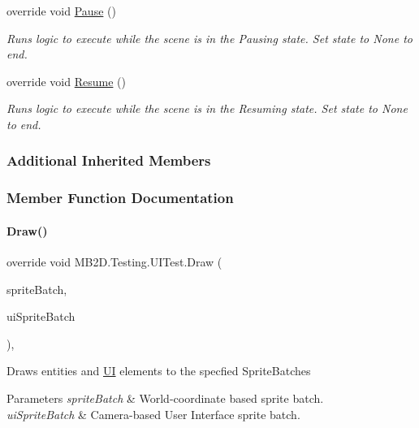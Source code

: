 \begin{DoxyCompactItemize}
override void \hyperlink{class_m_b2_d_1_1_testing_1_1_u_i_test_ae829ddfd489047674efb3131d360901a}{Pause} ()
\begin{DoxyCompactList}\small\item\em Runs logic to execute while the scene is in the Pausing state. Set state to None to end. \end{DoxyCompactList}\item 
override void \hyperlink{class_m_b2_d_1_1_testing_1_1_u_i_test_a933c2bf347db47bf2921709c10d78acc}{Resume} ()
\begin{DoxyCompactList}\small\item\em Runs logic to execute while the scene is in the Resuming state. Set state to None to end. \end{DoxyCompactList}\end{DoxyCompactItemize}
\subsubsection*{Additional Inherited Members}


\subsubsection{Member Function Documentation}
\hypertarget{class_m_b2_d_1_1_testing_1_1_u_i_test_a9656d2d62517288a7b4387dafe741ea0}{}\label{class_m_b2_d_1_1_testing_1_1_u_i_test_a9656d2d62517288a7b4387dafe741ea0} 
\paragraph{\texorpdfstring{Draw()}{Draw()}}
{\footnotesize\ttfamily override void M\+B2\+D.\+Testing.\+U\+I\+Test.\+Draw (\begin{DoxyParamCaption}\item[{Sprite\+Batch}]{sprite\+Batch,  }\item[{Sprite\+Batch}]{ui\+Sprite\+Batch }\end{DoxyParamCaption})\hspace{0.3cm}{\ttfamily [inline]}, {\ttfamily [virtual]}}



Draws entities and \hyperlink{namespace_m_b2_d_1_1_u_i}{UI} elements to the specfied Sprite\+Batches 


\begin{DoxyParams}{Parameters}
{\em sprite\+Batch} & World-\/coordinate based sprite batch.\\
\hline
{\em ui\+Sprite\+Batch} & Camera-\/based User Interface sprite batch.\\
\hline
\end{DoxyParams}



